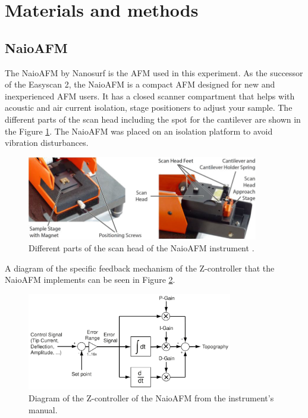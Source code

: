 \documentclass[11pt,a4paper]{article}
\begin{document}
\section{Materials and methods}

\subsection{NaioAFM}

The NaioAFM by Nanosurf \cite{NaioAFM} is the AFM used in this experiment. As the successor of the Easyscan 2, the NaioAFM is a compact AFM designed for new and inexperienced AFM users. It has a closed scanner compartment that helps with acoustic and air current isolation, stage positioners to adjust your sample. The different parts of the scan head including the spot for the cantilever are shown in the Figure \ref{fig:naioafm}. The NaioAFM was placed on an isolation platform to avoid vibration disturbances.

\begin{figure}[hbt]
\centering
\includegraphics[width=0.9\textwidth]{naioafm2}
\caption{Different parts of the scan head of the NaioAFM instrument \cite{NaioAFM}.}
\label{fig:naioafm}
\end{figure}

A diagram of the specific feedback mechanism of the Z-controller that the NaioAFM implements can be seen in Figure \ref{fig:feedback_z-controller}.

\begin{figure}[hbt]
\centering
\includegraphics[width=0.8\textwidth]{Feedback_NaioAFM}
\caption{Diagram of the Z-controller of the NaioAFM from the instrument's manual.}
\label{fig:feedback_z-controller}
\end{figure}
\end{document}
